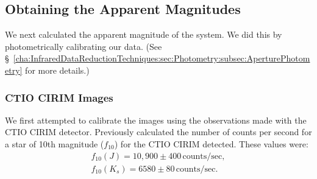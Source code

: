 
\subsection{Obtaining the Apparent Magnitudes}\label{cha:lightcurve:sec:Photometry:subsec:PhotometricCalibration}

We next calculated the apparent magnitude of the system. We did this by photometrically calibrating our data. (See \S~\vref{cha:InfraredDataReductionTechniques:sec:Photometry:subsec:AperturePhotometry} for more details.) %


\subsubsection{CTIO CIRIM Images}\label{cha:lightcurve:sec:Photometry:subsec:PhotometricCalibration:subsubsec:ctio}

We first attempted to calibrate the images using the observations made
with the CTIO CIRIM detector. Previously  calculated the number of counts per second for a star of 10th magnitude ($f_{10}$) for the CTIO CIRIM detected. These values were:%
\begin{eqnarray} \label{cha:lightcurve:sec:Photometry:subsec:PhotometricCalibration:subsubsec:ctio:eqn:f10}
f_{10}(J) = 10,900\pm400\,\mathrm{counts/sec},\\\nonumber%
f_{10}(K_s) = 6580\pm80\,\mathrm{counts/sec}.%
\end{eqnarray} %

